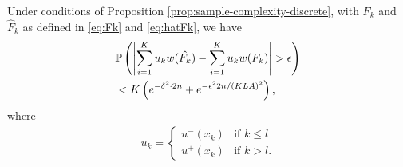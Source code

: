 \begin{proposition}
\label{prop:discrete-first-term}
Under conditions of Proposition \ref{prop:sample-complexity-discrete}, with $F_k$ and $\hat F_k$ as defined in \eqref{eq:Fk} and \eqref{eq:hatFk},  we have
\begin{align*}
&\mathbb{P}\left( \left| \sum_{i=1}^K u_{k} w(\hat{F_k}) - \sum_{i=1}^K u_{k} w(F_k) \right| >\epsilon \right)\\
& < K\left(
e^{-\delta^2\cdot 2n} + e^{-\epsilon^2 2n/(KLA)^2}\right),
\end{align*}
where
\begin{align}
\label{eq:uplusminusxk}
u_k = 
\begin{cases}
   u^{-}(x_{k}) & \text{if   } k \leq l \\
   u^{+}(x_{k}) & \text{if  }  k > l.
\end{cases}  
\end{align} 
\end{proposition}

